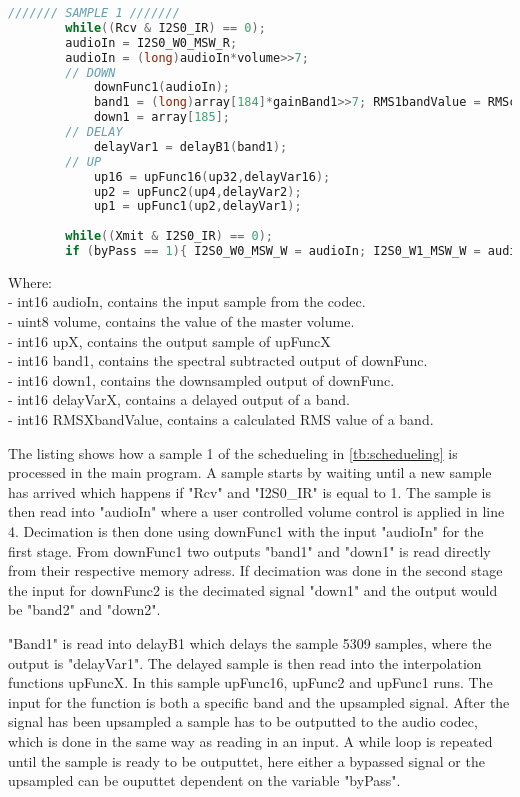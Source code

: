\begin{lstlisting}[language=C, caption = {Sample 1},label={listingSample}]
/////// SAMPLE 1 ///////
    	while((Rcv & I2S0_IR) == 0); 							
	    audioIn = I2S0_W0_MSW_R;  
	    audioIn = (long)audioIn*volume>>7;	
	    // DOWN
		    downFunc1(audioIn); 			
			band1 = (long)array[184]*gainBand1>>7; RMS1bandValue = RMScalculate(RMS1bandBuffer,band1,&RMS1bandPtr, &RMS1bandSum);				
			down1 = array[185];							
		// DELAY			
			delayVar1 = delayB1(band1);
		// UP
			up16 = upFunc16(up32,delayVar16);
			up2 = upFunc2(up4,delayVar2);
			up1 = upFunc1(up2,delayVar1);
		
	    while((Xmit & I2S0_IR) == 0);  					
		if (byPass == 1){ I2S0_W0_MSW_W = audioIn; I2S0_W1_MSW_W = audioIn;} else { I2S0_W0_MSW_W = up1; I2S0_W1_MSW_W = up1;} 
\end{lstlisting}
Where: \\
- int16 audioIn, contains the input sample from the codec. \\
- uint8 volume, contains the value of the master volume. \\
- int16 upX, contains the output sample of upFuncX \\
- int16 band1, contains the spectral subtracted output of downFunc. \\
- int16 down1, contains the downsampled output of downFunc. \\
- int16 delayVarX, contains a delayed output of a band. \\
- int16 RMSXbandValue, contains a calculated RMS value of a band.

The listing shows how a sample 1 of the schedueling in \autoref{tb:schedueling} is processed in the main program. A sample starts by waiting until a new sample has arrived which happens if "Rcv" and "I2S0\_IR" is equal to 1. The sample is then read into "audioIn" where a user controlled volume control is applied in line 4. Decimation is then done using downFunc1 with the input "audioIn" for the first stage. From downFunc1 two outputs "band1" and "down1" is read directly from their respective memory adress. If decimation was done in the second stage the input for downFunc2 is the decimated signal "down1" and the output would be "band2" and "down2".

"Band1" is read into delayB1 which delays the sample 5309 samples, where the output is "delayVar1". The delayed sample is then read into the interpolation functions upFuncX. In this sample upFunc16, upFunc2 and upFunc1 runs. The input for the function is both a specific band and the upsampled signal. After the signal has been upsampled a sample has to be outputted to the audio codec, which is done in the same way as reading in an input. A while loop is repeated until the sample is ready to be outputtet, here either a bypassed signal or the upsampled can be ouputtet dependent on the variable "byPass". %



